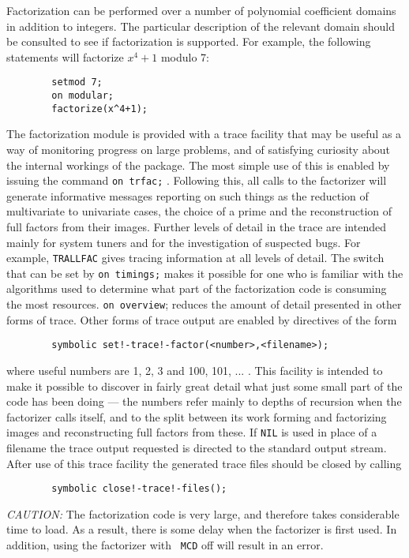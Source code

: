 Factorization can be performed over a number of polynomial coefficient
domains in addition to integers. The particular description of the relevant
domain should be consulted to see if factorization is supported. For
example, the following statements will factorize $x^{4}+1$ modulo 7:
\begin{verbatim}
        setmod 7;
        on modular;
        factorize(x^4+1);
\end{verbatim}
The factorization module is provided with a trace facility that may be useful
as a way of monitoring progress on large problems, and of satisfying
curiosity about the internal workings of the package. The most simple use
of this is enabled by issuing the {\REDUCE} command
{\tt on trfac;} .
Following this, all calls to the factorizer will generate informative
messages reporting on such things as the reduction of multivariate to
univariate cases, the choice of a prime and the reconstruction of full
factors from their images.  Further levels of detail in the trace are
intended mainly for system tuners and for the investigation of suspected
bugs.  For example, {\tt TRALLFAC} gives tracing information at all levels
of detail.  The switch that can be set by {\tt on timings;} makes it
possible for one who is familiar with the algorithms used to determine
what part of the factorization code is consuming the most resources.
{\tt on overview}; reduces the amount of detail presented in other forms of
trace.  Other forms of trace output are enabled by directives of the form
\begin{verbatim}
        symbolic set!-trace!-factor(<number>,<filename>);
\end{verbatim}
where useful numbers are 1, 2, 3 and 100, 101, ... .  This facility is
intended to make it possible to discover in fairly great detail what just
some small part of the code has been doing --- the numbers refer mainly to
depths of recursion when the factorizer calls itself, and to the split
between its work forming and factorizing images and reconstructing full
factors from these.  If {\tt NIL} is used in place of a filename the trace
output requested is directed to the standard output stream.  After use of
this trace facility the generated trace files should be closed by calling
\begin{verbatim}
        symbolic close!-trace!-files();
\end{verbatim}
{\it CAUTION:}  The factorization code is very large, and therefore takes
considerable time to load.  As a result, there is some delay when the
factorizer is first used.  In addition, using the factorizer with {\tt
MCD} off will result in an error.

